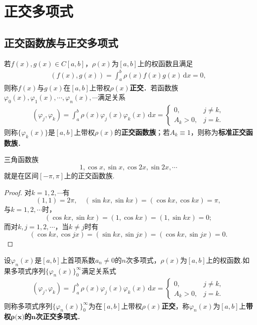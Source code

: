 \documentclass[../../main.tex]{subfiles}
\begin{document}
\section{正交多项式}

\subsection{正交函数族与正交多项式}

\begin{definition}
若\( f(x),g(x) \in C[a,b] \)，\(\rho(x)\)为\([a,b]\)上的权函数且满足
\begin{align}
(f(x),g(x)) = \int_a^b \rho(x) f(x) g(x) \, \mathrm{d}x = 0, \label{2.1}
\end{align}
则称\( f(x) \)与\( g(x) \)在\([a,b]\)上带权\(\rho(x)\)\textbf{正交}．若函数族\(\varphi_0(x),\varphi_1(x),\cdots,\varphi_n(x),\cdots\)满足关系
\begin{align}
(\varphi_j,\varphi_k) = \int_a^b \rho(x)\varphi_j(x)\varphi_k(x) \, \mathrm{d}x = \begin{cases}
0, & j \neq k, \\
A_k > 0, & j = k.
\end{cases} \label{2.2}
\end{align}
则称\(\{\varphi_k(x)\}\)是\([a,b]\)上带权\(\rho(x)\)的\textbf{正交函数族}；若\( A_k \equiv 1 \)，则称为\textbf{标准正交函数族}．
\end{definition}

\begin{example}
三角函数族
\[
1,\cos x,\sin x,\cos 2x,\sin 2x,\cdots
\]
就是在区间\([-\pi,\pi]\)上的正交函数族.
\end{example}
\begin{proof}
对\( k=1,2,\cdots \)有
\[
(1,1) = 2\pi, \quad (\sin kx,\sin kx) = (\cos kx,\cos kx) = \pi,
\]
与\( k=1,2,\cdots \)时，
\[
(\cos kx,\sin kx) = (1,\cos kx) = (1,\sin kx) = 0;
\]
而对\( k,j=1,2,\cdots \)，当\( k \neq j \)时有
\[
(\cos kx,\cos jx) = (\sin kx,\sin jx) = (\cos kx,\sin jx) = 0.
\]
\end{proof}

\begin{definition}
设$\varphi_n(x)$是$[a,b]$上首项系数$a_n \neq 0$的$n$次多项式，$\rho(x)$为$[a,b]$上的权函数.如果多项式序列$\{\varphi_n(x)\}_{0}^{\infty}$满足关系式
\begin{align*}
(\varphi_j,\varphi_k) = \int_a^b \rho(x)\varphi_j(x)\varphi_k(x) \, \mathrm{d}x = \begin{cases}
0, & j \neq k, \\
A_k > 0, & j = k.
\end{cases}
\end{align*}
则称多项式序列$\{\varphi_n(x)\}_{0}^{\infty}$为在$[a,b]$上带权$\rho(x)$\textbf{正交}，称$\varphi_n(x)$为$[a,b]$上\textbf{带权$\boldsymbol{\rho }\mathbf{(}\boldsymbol{x}\mathbf{)}$的$\boldsymbol{n}$次正交多项式}．
\end{definition}
\end{document}
